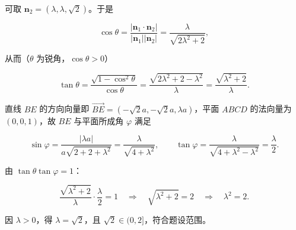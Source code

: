 \begin{answer}
可取 $\boldsymbol n_2=(\lambda,\lambda,\sqrt2)$。于是

\nopagebreak[4]
\[\cos\theta=\frac{|\boldsymbol n_1\cdot\boldsymbol n_2|}{|\boldsymbol n_1||\boldsymbol n_2|}=\frac{\lambda}{\sqrt{2\lambda^2+2}},\]

从而（$\theta$ 为锐角，$\cos\theta>0$）

\nopagebreak[4]
\[\tan\theta=\frac{\sqrt{1-\cos^2\theta}}{\cos\theta}=\frac{\sqrt{2\lambda^2+2-\lambda^2}}{\lambda}=\frac{\sqrt{\lambda^2+2}}{\lambda}.\]

直线 $BE$ 的方向向量即 $\overrightarrow{BE}=(-\sqrt2a,-\sqrt2a,\lambda a)$，平面 $ABCD$ 的法向量为 $(0,0,1)$，故 $BE$ 与平面所成角 $\varphi$ 满足

\nopagebreak[4]
\[\sin\varphi=\frac{|\lambda a|}{a\sqrt{2+2+\lambda^2}}=\frac{\lambda}{\sqrt{4+\lambda^2}},\qquad
\tan\varphi=\frac{\lambda}{\sqrt{4+\lambda^2-\lambda^2}}=\frac{\lambda}{2}.\]

由 $\tan\theta\tan\varphi=1$：

\nopagebreak[4]
\[\frac{\sqrt{\lambda^2+2}}{\lambda}\cdot\frac{\lambda}{2}=1\quad\Longrightarrow\quad\sqrt{\lambda^2+2}=2\quad\Longrightarrow\quad\lambda^2=2.\]

因 $\lambda>0$，得 $\lambda=\sqrt2$，且 $\sqrt2\in(0,2]$，符合题设范围。


\end{answer}
